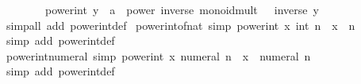 \begin{isabellebody}
\ \ \ \ \ \ \ \ {\isachardoublequoteopen}power{\isacharunderscore}{\kern0pt}int\ {\isacharparenleft}{\kern0pt}y\ {\isacharcolon}{\kern0pt}{\isacharcolon}{\kern0pt}\ {\isacharprime}{\kern0pt}a\ {\isacharcolon}{\kern0pt}{\isacharcolon}{\kern0pt}\ {\isacharbraceleft}{\kern0pt}power{\isacharcomma}{\kern0pt}\ inverse{\isacharcomma}{\kern0pt}\ monoid{\isacharunderscore}{\kern0pt}mult{\isacharbraceright}{\kern0pt}{\isacharparenright}{\kern0pt}\ {\isacharparenleft}{\kern0pt}{\isacharminus}{\kern0pt}{}{\isacharparenright}{\kern0pt}\ {\isacharequal}{\kern0pt}\ inverse\ y{\isachardoublequoteclose}\isanewline
%
\isadelimproof
\ \ %
\endisadelimproof
%
\isatagproof
{}\isamarkupfalse%
\ {\isacharparenleft}{\kern0pt}simp{\isacharunderscore}{\kern0pt}all\ add{\isacharcolon}{\kern0pt}\ power{\isacharunderscore}{\kern0pt}int{\isacharunderscore}{\kern0pt}def{\isacharparenright}{\kern0pt}%
\endisatagproof
{\isafoldproof}%
%
\isadelimproof
\isanewline
%
\endisadelimproof
\isanewline
{}\isamarkupfalse%
\ power{\isacharunderscore}{\kern0pt}int{\isacharunderscore}{\kern0pt}of{\isacharunderscore}{\kern0pt}nat\ {\isacharbrackleft}{\kern0pt}simp{\isacharbrackright}{\kern0pt}{\isacharcolon}{\kern0pt}\ {\isachardoublequoteopen}power{\isacharunderscore}{\kern0pt}int\ x\ {\isacharparenleft}{\kern0pt}int\ n{\isacharparenright}{\kern0pt}\ {\isacharequal}{\kern0pt}\ x\ {\isacharcircum}{\kern0pt}\ n{\isachardoublequoteclose}\isanewline
%
\isadelimproof
\ \ %
\endisadelimproof
%
\isatagproof
{}\isamarkupfalse%
\ {\isacharparenleft}{\kern0pt}simp\ add{\isacharcolon}{\kern0pt}\ power{\isacharunderscore}{\kern0pt}int{\isacharunderscore}{\kern0pt}def{\isacharparenright}{\kern0pt}%
\endisatagproof
{\isafoldproof}%
%
\isadelimproof
\isanewline
%
\endisadelimproof
\isanewline
{}\isamarkupfalse%
\ power{\isacharunderscore}{\kern0pt}int{\isacharunderscore}{\kern0pt}numeral\ {\isacharbrackleft}{\kern0pt}simp{\isacharbrackright}{\kern0pt}{\isacharcolon}{\kern0pt}\ {\isachardoublequoteopen}power{\isacharunderscore}{\kern0pt}int\ x\ {\isacharparenleft}{\kern0pt}numeral\ n{\isacharparenright}{\kern0pt}\ {\isacharequal}{\kern0pt}\ x\ {\isacharcircum}{\kern0pt}\ numeral\ n{\isachardoublequoteclose}\isanewline
%
\isadelimproof
\ \ %
\endisadelimproof
%
\isatagproof
{}\isamarkupfalse%
\ {\isacharparenleft}{\kern0pt}simp\ add{\isacharcolon}{\kern0pt}\ power{\isacharunderscore}{\kern0pt}int{\isacharunderscore}{\kern0pt}def{\isacharparenright}{\kern0pt}%
\endisatagproof
{\isafoldproof}%
%
\isadelimproof
\isanewline
%
\endisadelimproof

\end{isabellebody}
